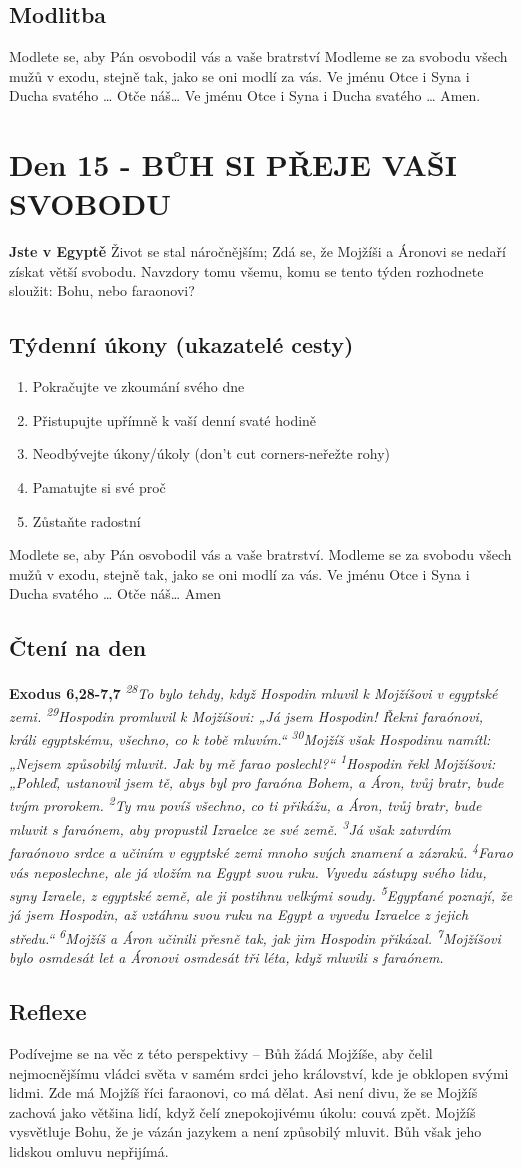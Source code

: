 \documentclass[11pt]{article}
\newcommand{\zacatekTretiTyden}{
  \textbf{Jste v Egyptě} \newline
  Život se stal náročnějším; Zdá se, že Mojžíši a Áronovi se nedaří získat větší svobodu. Navzdory tomu všemu,
komu se tento týden rozhodnete sloužit: Bohu, nebo faraonovi?

\subsection*{Týdenní úkony (ukazatelé cesty)}
\begin{enumerate}
  \item Pokračujte ve zkoumání svého dne
  \item Přistupujte upřímně k vaší denní svaté hodině
  \item Neodbývejte úkony/úkoly (don’t cut corners-neřežte rohy)
  \item Pamatujte si své proč
  \item Zůstaňte radostní
\end{enumerate}
Modlete se, aby Pán osvobodil vás a vaše bratrství. \newline
Modleme se za svobodu všech mužů v exodu, stejně tak, jako se oni modlí za vás.\newline
Ve jménu Otce i Syna i Ducha svatého …  Otče náš… Amen
}
\begin{document}
\subsection*{Modlitba}
Modlete se, aby Pán osvobodil vás a vaše bratrství \newline
Modleme se za svobodu všech mužů v exodu, stejně tak, jako se oni modlí za vás.\newline
Ve jménu Otce i Syna i Ducha svatého … Otče náš… Ve jménu Otce i Syna i Ducha svatého … Amen.

\newpage


\newpage
\section{Den 15 - BŮH SI PŘEJE VAŠI SVOBODU}
\zacatekTretiTyden
\subsection*{Čtení na den}
\textbf{Exodus 6,28-7,7}
\newline
\textit{
\textsuperscript{28}To bylo tehdy, když Hospodin mluvil k Mojžíšovi v egyptské zemi.
\textsuperscript{29}Hospodin promluvil k Mojžíšovi: „Já jsem Hospodin! Řekni faraónovi, králi egyptskému, všechno, co k tobě mluvím.“
\textsuperscript{30}Mojžíš však Hospodinu namítl: „Nejsem způsobilý mluvit. Jak by mě farao poslechl?“
\textsuperscript{1}Hospodin řekl Mojžíšovi: „Pohleď, ustanovil jsem tě, abys byl pro faraóna Bohem, a Áron, tvůj bratr, bude tvým prorokem.
\textsuperscript{2}Ty mu povíš všechno, co ti přikážu, a Áron, tvůj bratr, bude mluvit s faraónem, aby propustil Izraelce ze své země.
\textsuperscript{3}Já však zatvrdím faraónovo srdce a učiním v egyptské zemi mnoho svých znamení a zázraků.
\textsuperscript{4}Farao vás neposlechne, ale já vložím na Egypt svou ruku. Vyvedu zástupy svého lidu, syny Izraele, z egyptské země, ale ji postihnu velkými soudy.
\textsuperscript{5}Egypťané poznají, že já jsem Hospodin, až vztáhnu svou ruku na Egypt a vyvedu Izraelce z jejich středu.“
\textsuperscript{6}Mojžíš a Áron učinili přesně tak, jak jim Hospodin přikázal.
\textsuperscript{7}Mojžíšovi bylo osmdesát let a Áronovi osmdesát tři léta, když mluvili s faraónem.
}

\subsection*{Reflexe}
Podívejme se na věc z této perspektivy – Bůh žádá Mojžíše, aby čelil nejmocnějšímu vládci světa v samém srdci
jeho království, kde je obklopen svými lidmi. Zde má Mojžíš říci faraonovi, co má dělat. Asi není divu, že se
Mojžíš zachová jako většina lidí, když čelí znepokojivému úkolu: couvá zpět. Mojžíš vysvětluje Bohu, že je vázán
jazykem a není způsobilý mluvit. Bůh však jeho lidskou omluvu nepřijímá.
\end{document}
